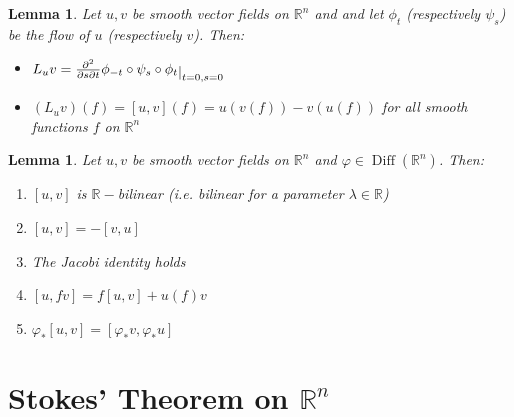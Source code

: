 \documentclass[a4paper,11pt,titlepage]{article}
\numberwithin{equation}{section}
\newtheorem{lemma}[theorem]{Lemma}
\theoremstyle{definition}
\theoremstyle{remark}
\DeclareMathOperator{\Diff}{Diff}
\newcommand{\rfield}{\mathbb{R}}
\newcommand{\restrict}[2]{{#1}\raisebox{-.5ex}{$|$}_{#2}}
\begin{document}
\begin{lemma}
  Let $u, v$ be smooth vector fields on $\rfield^n$ and and let $\phi_t$ (respectively $\psi_s$) be the flow of $u$ (respectively $v$). Then:
  \begin{itemize}
    \item $L_u v = \restrict{\frac{\partial^2}{\partial s \partial t} \phi_{-t} \circ \psi_s \circ \phi_t}{t=0,s=0}$
    \item $(L_u v) (f) = [u, v](f) = u(v(f)) - v(u(f))$ for all smooth functions $f$ on $\rfield^n$
  \end{itemize}
\end{lemma}

\begin{lemma}
  Let $u, v$ be smooth vector fields on $\rfield^n$ and $\varphi \in \Diff(\rfield^n)$. Then:
  \begin{enumerate}
    \item $[u, v]$ is $\rfield-$bilinear (i.e. bilinear for a parameter $\lambda \in \rfield$)
    \item $[u, v] = - [v, u]$
    \item The Jacobi identity holds
    \item $[u, fv] = f[u, v] + u(f)v$
    \item $\varphi_*[u, v] = [\varphi_* v, \varphi_* u]$
  \end{enumerate}
\end{lemma}
\newpage
  \section{Stokes' Theorem on $\rfield^n$}
\end{document}
